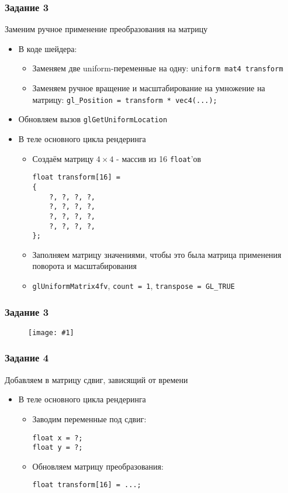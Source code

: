 \documentclass{beamer}
\newcommand{\slideimage}[1]{
  \begin{figure}
    \begin{adjustbox}{width=\textwidth, totalheight=\textheight-2\baselineskip-2\baselineskip,keepaspectratio}
      \texttt{[image: \#1]}
    \end{adjustbox}
  \end{figure}
}
\begin{document}
\begin{frame}[fragile]
\frametitle{Задание 3}
Заменим ручное применение преобразования на матрицу
\begin{itemize}
\item В коде шейдера:
\begin{itemize}
\item Заменяем две uniform-переменные на одну: \verb|uniform mat4 transform|
\item Заменяем ручное вращение и масштабирование на умножение на матрицу: \verb|gl_Position = transform * vec4(...);|
\end{itemize}
\item Обновляем вызов \verb|glGetUniformLocation|
\item В теле основного цикла рендеринга
\begin{itemize}
\item Создаём матрицу \begin{math}4\times 4\end{math} - массив из 16 \verb|float|'ов
\begin{verbatim}
float transform[16] =
{
    ?, ?, ?, ?,
    ?, ?, ?, ?,
    ?, ?, ?, ?,
    ?, ?, ?, ?,
};
\end{verbatim}
\item Заполняем матрицу значениями, чтобы это была матрица применения поворота и масштабирования
\item \verb|glUniformMatrix4fv|, \verb|count = 1|, \verb|transpose = GL_TRUE|
\end{itemize}
\end{itemize}
\end{frame}

\begin{frame}
\frametitle{Задание 3}
\slideimage{2.png}
\end{frame}

\begin{frame}[fragile]
\frametitle{Задание 4}
Добавляем в матрицу сдвиг, зависящий от времени
\begin{itemize}
\item В теле основного цикла рендеринга
\begin{itemize}
\item Заводим переменные под сдвиг:
\begin{verbatim}
float x = ?;
float y = ?;
\end{verbatim}
\item Обновляем матрицу преобразования:
\begin{verbatim}
float transform[16] = ...;
\end{verbatim}
\end{itemize}
\end{itemize}
\end{frame}
\end{document}
